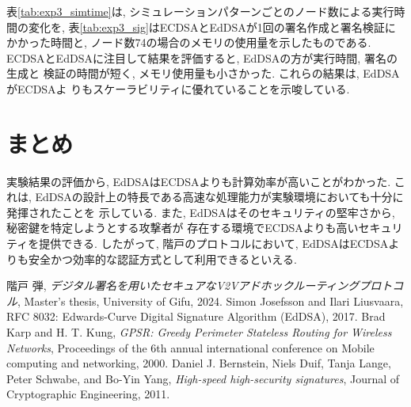 \documentclass[a4j,9pt,twocolumn]{jsarticle}
\begin{document}
表\ref{tab:exp3_simtime}は, シミュレーションパターンごとのノード数による実行時間の変化を, 
表\ref{tab:exp3_sig}はECDSAとEdDSAが1回の署名作成と署名検証にかかった時間と, 
ノード数74の場合のメモリの使用量を示したものである. \\
\indent ECDSAとEdDSAに注目して結果を評価すると, EdDSAの方が実行時間, 署名の生成と
検証の時間が短く, メモリ使用量も小さかった. これらの結果は, EdDSAがECDSAよ
りもスケーラビリティに優れていることを示唆している. 

\section{まとめ}
\indent 実験結果の評価から, EdDSAはECDSAよりも計算効率が高いことがわかった. 
これは, EdDSAの設計上の特長である高速な処理能力が実験環境においても十分に発揮されたことを
示している. また, EdDSAはそのセキュリティの堅牢さから, 秘密鍵を特定しようとする攻撃者が
存在する環境でECDSAよりも高いセキュリティを提供できる. したがって, 階戸のプロトコルにおいて, 
EdDSAはECDSAよりも安全かつ効率的な認証方式として利用できるといえる. 



\noindent\hrulefill %
\begin{thebibliography}{99}
     階戸 弾,
        \textit{デジタル署名を用いたセキュアなV2Vアドホックルーティングプロトコル},
        Master's thesis, University of Gifu, 2024.
     Simon Josefsson and Ilari Liusvaara, 
        RFC 8032: Edwards-Curve Digital Signature Algorithm (EdDSA), 2017.
     Brad Karp and H. T. Kung, 
        \textit{GPSR: Greedy Perimeter Stateless Routing for Wireless Networks},
        Proceedings of the 6th annual international conference on Mobile computing and networking, 2000.
     Daniel J. Bernstein, Niels Duif, Tanja Lange, Peter Schwabe, and Bo-Yin Yang,
        \textit{High-speed high-security signatures}, Journal of Cryptographic Engineering, 2011.
\end{thebibliography}

\end{document}
